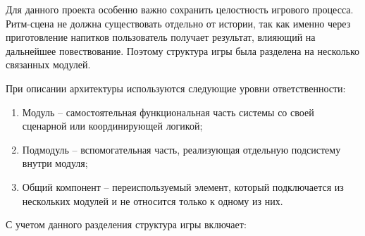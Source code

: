 \documentclass[utf8, russian]{eskdtext}
\numberwithin{equation}{section}
\begin{document}
Для данного проекта особенно важно сохранить целостность игрового процесса. Ритм-сцена не должна существовать отдельно от истории, так как именно через приготовление напитков пользователь получает результат, влияющий на дальнейшее повествование. Поэтому структура игры была разделена на несколько связанных модулей.

При описании архитектуры используются следующие уровни ответственности:
\begin{enumerate}
    \item Модуль -- самостоятельная функциональная часть системы со своей сценарной или координирующей логикой;
    \item Подмодуль -- вспомогательная часть, реализующая отдельную подсистему внутри модуля;
    \item Общий компонент -- переиспользуемый элемент, который подключается из нескольких модулей и не относится только к одному из них.
\end{enumerate}

С учетом данного разделения структура игры включает:
\end{document}

